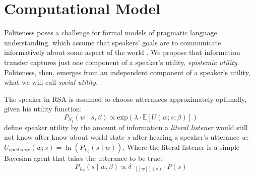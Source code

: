 \documentclass[10pt,letterpaper]{article}
\newcommand{\denote}[1]{\mbox{ $[\![ #1 ]\!]$}}
\begin{document}
\section{Computational Model}

Politeness poses a challenge for formal models of pragmatic language understanding, which assume that speakers' goals are to communicate informatively about some aspect of the world \cite{Frank2012, Goodman2013}. 
We propose that information transfer captures just one component of a speaker's utility, \emph{epistemic utility}.
Politeness, then, emerges from an independent component of a speaker's utility, what we will call \emph{social utility}. 

The speaker in RSA is assumed to choose utterances approximately optimally, given his utility function:
$$
P_{S_1}(w \mid s, \beta) \propto \mathrm{exp}(\lambda \cdot \mathbb{E}[U(w; s; \beta)])\label{eq:S1}
$$
 define speaker utility by the amount of information a \emph{literal listener} would still not know after know about world state $s$ after hearing a speaker's utterance $w$: 
$U_{epistemic}(w; s) = \ln(P_{L_0}(s \mid w)) $.
Where the literal listener is a simple Bayesian agent that takes the utterance to be true:
$$
P_{L_0}(s \mid w, \beta)\propto \delta_{\denote{w}(s)} \cdot P(s) \label{eq:L0}
$$
\end{document}
